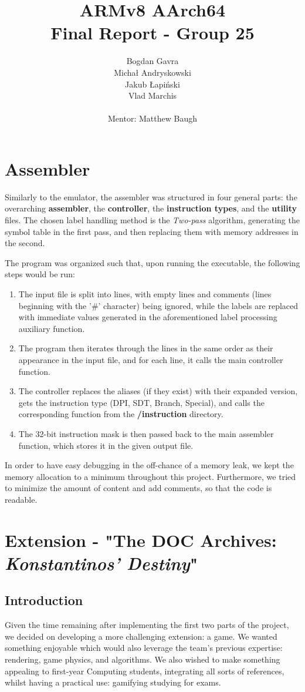 \documentclass{article}
\title{ARMv8 AArch64\\
       \large Final Report - Group 25}
\author{
        Bogdan Gavra \\
        Michał Andryskowski\\
        Jakub Łapiński\\
        Vlad Marchis\\\\
        Mentor: 
        Matthew Baugh
        }
\begin{document}
\maketitle
\section{Assembler}
Similarly to the emulator, the assembler was structured in four general parts: the overarching \textbf{assembler}, the \textbf{controller}, the \textbf{instruction types}, and the \textbf{utility} files. The chosen label handling method is the \textit{Two-pass} algorithm, generating the symbol table in the first pass, and then replacing them with memory addresses in the second.\par
The program was organized such that, upon running the executable, the following steps would be run:
\begin{enumerate}
    \item The input file is split into lines, with empty lines and comments (lines beginning with the '\#' character) being ignored, while the labels are replaced with immediate values generated in the aforementioned label processing auxiliary function.
    \item The program then iterates through the lines in the same order as their appearance in the input file, and for each line, it calls the main controller function.
    \item The controller replaces the aliases (if they exist) with their expanded version, gets the instruction type (DPI, SDT, Branch, Special), and calls the corresponding function from the \textbf{/instruction} directory.
    \item The 32-bit instruction mask is then passed back to the main assembler function, which stores it in the given output file.
\end{enumerate}
In order to have easy debugging in the off-chance of a memory leak, we kept the memory allocation to a minimum throughout this project. Furthermore, we tried to minimize the amount of content and add comments, so that the code is readable.

\section{Extension - "The DOC Archives: \textit{Konstantinos' Destiny}"}

\subsection{Introduction}
Given the time remaining after implementing the first two parts of the project, we decided on developing a more challenging extension: a game. We wanted something enjoyable which would also leverage the team's previous expertise: rendering, game physics, and algorithms. We also wished to make something appealing to first-year Computing students, integrating all sorts of references, whilst having a practical use: gamifying studying for exams.
\end{document}
